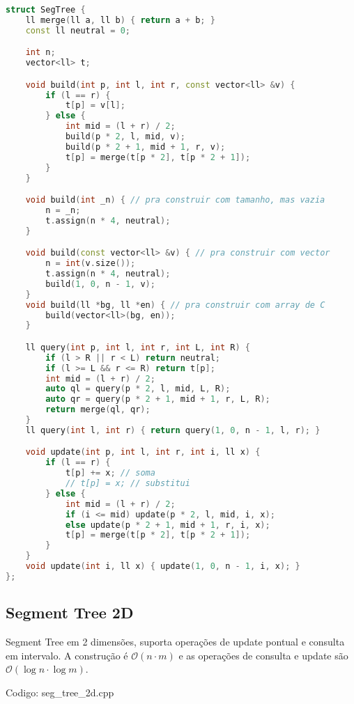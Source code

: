 \documentclass[10pt, a4paper, oneside]{book}
\begin{document}
\begin{lstlisting}[language=C++]
struct SegTree {
    ll merge(ll a, ll b) { return a + b; }
    const ll neutral = 0;

    int n;
    vector<ll> t;

    void build(int p, int l, int r, const vector<ll> &v) {
        if (l == r) {
            t[p] = v[l];
        } else {
            int mid = (l + r) / 2;
            build(p * 2, l, mid, v);
            build(p * 2 + 1, mid + 1, r, v);
            t[p] = merge(t[p * 2], t[p * 2 + 1]);
        }
    }

    void build(int _n) { // pra construir com tamanho, mas vazia
        n = _n;
        t.assign(n * 4, neutral);
    }

    void build(const vector<ll> &v) { // pra construir com vector
        n = int(v.size());
        t.assign(n * 4, neutral);
        build(1, 0, n - 1, v);
    }
    void build(ll *bg, ll *en) { // pra construir com array de C
        build(vector<ll>(bg, en));
    }

    ll query(int p, int l, int r, int L, int R) {
        if (l > R || r < L) return neutral;
        if (l >= L && r <= R) return t[p];
        int mid = (l + r) / 2;
        auto ql = query(p * 2, l, mid, L, R);
        auto qr = query(p * 2 + 1, mid + 1, r, L, R);
        return merge(ql, qr);
    }
    ll query(int l, int r) { return query(1, 0, n - 1, l, r); }

    void update(int p, int l, int r, int i, ll x) {
        if (l == r) {
            t[p] += x; // soma
            // t[p] = x; // substitui
        } else {
            int mid = (l + r) / 2;
            if (i <= mid) update(p * 2, l, mid, i, x);
            else update(p * 2 + 1, mid + 1, r, i, x);
            t[p] = merge(t[p * 2], t[p * 2 + 1]);
        }
    }
    void update(int i, ll x) { update(1, 0, n - 1, i, x); }
};
\end{lstlisting}
\hfill

\subsection{Segment Tree 2D}


Segment Tree em 2 dimensões, suporta operações de update pontual e consulta em intervalo. A construção é $\mathcal{O}(n \cdot m)$ e as operações de consulta e update são $\mathcal{O}(\log n \cdot \log m)$.
\hfill

Codigo: seg\_tree\_2d.cpp
\end{document}
